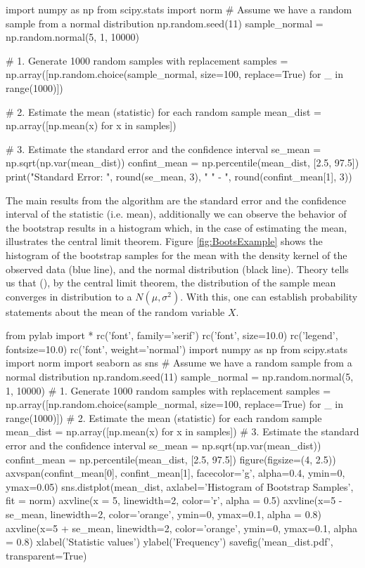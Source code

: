 \documentclass[11pt]{article}
\begin{document}
\begin{pyblock}
import numpy as np
from scipy.stats import norm
# Assume we have a random sample from a normal distribution
np.random.seed(11)
sample_normal = np.random.normal(5, 1, 10000)

# 1. Generate 1000 random samples with replacement
samples = np.array([np.random.choice(sample_normal,
                    size=100, replace=True) for _ in range(1000)])

# 2. Estimate the mean (statistic) for each random sample
mean_dist = np.array([np.mean(x) for x in samples])

# 3. Estimate the standard error and the confidence interval
se_mean = np.sqrt(np.var(mean_dist))
confint_mean = np.percentile(mean_dist, [2.5, 97.5])
print("Standard Error: ",  round(se_mean, 3),
        "%
        " - ", round(confint_mean[1], 3))
\end{pyblock}

\printpythontex[verbatim]

\medskip

The main results from the algorithm are the standard error and the confidence interval of the statistic (i.e. mean), additionally
we can observe the behavior of the bootstrap results in a histogram which, in the case of estimating the mean, illustrates the central
limit theorem. Figure \ref{fig:BootsExample} shows the histogram of the bootstrap samples for the mean with the density kernel of
the observed data (blue line), and the normal distribution (black line). Theory tells us that (\cite{LW04}), by the central limit theorem,
the distribution of the sample mean converges in distribution to a $N(\mu, \sigma^2)$. With this, one can establish
probability statements about the mean of the random variable $X$.


\begin{pycode}
from pylab import *
rc('font', family='serif')
rc('font', size=10.0)
rc('legend', fontsize=10.0)
rc('font', weight='normal')
import numpy as np
from scipy.stats import norm
import seaborn as sns
# Assume we have a random sample from a normal distribution
np.random.seed(11)
sample_normal = np.random.normal(5, 1, 10000)
# 1. Generate 1000 random samples with replacement
samples = np.array([np.random.choice(sample_normal,
                    size=100, replace=True) for _ in range(1000)])
# 2. Estimate the mean (statistic) for each random sample
mean_dist = np.array([np.mean(x) for x in samples])
# 3. Estimate the standard error and the confidence interval
se_mean = np.sqrt(np.var(mean_dist))
confint_mean = np.percentile(mean_dist, [2.5, 97.5])
figure(figsize=(4, 2.5))
axvspan(confint_mean[0], confint_mean[1], facecolor='g', alpha=0.4, ymin=0, ymax=0.05)
sns.distplot(mean_dist, axlabel='Histogram of Bootstrap Samples', fit = norm)
axvline(x = 5, linewidth=2, color='r', alpha = 0.5)
axvline(x=5 - se_mean, linewidth=2, color='orange', ymin=0, ymax=0.1, alpha = 0.8)
axvline(x=5 + se_mean, linewidth=2, color='orange', ymin=0, ymax=0.1, alpha = 0.8)
xlabel('Statistic values')
ylabel('Frequency')
savefig('mean_dist.pdf', transparent=True)
\end{pycode}
\end{document}
